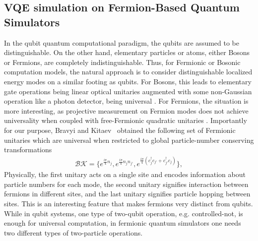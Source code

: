 \documentclass[aps, prx, reprint, superscriptaddress]{revtex4-2}
\begin{document}
\subsection{VQE simulation on Fermion-Based Quantum Simulators}
\label{subsec:vqe_fermionic_simulator}

In the qubit quantum computational paradigm, the qubits are assumed to be distinguishable. On the other hand, elementary particles or atoms, either Bosons or Fermions, are completely indistinguishable. Thus, for Fermionic or Bosonic computation models, the natural approach is to consider distinguishable localized energy modes on a similar footing as qubits. For Bosons, this leads to elementary gate operations being linear optical unitaries augmented with some non-Gaussian operation like a photon detector, being universal \cite{knill2001scheme}. For Fermions, the situation is more interesting, as projective measurement on Fermion modes does not achieve universality when coupled with free-Fermionic quadratic unitaries \citep{terhal2002classical}. Importantly for our purpose, Bravyi and Kitaev~\citep{bravyi2002fermionic} obtained the following set of Fermionic unitaries which are universal when restricted to global particle-number conserving transformations
\begin{eqnarray}
    \mathcal{BK} =   \lbrace e^{\frac{i \pi}{4} n_{j}}, e^{\frac{i \pi}{4} n_{j} n_{j'}},
    e^{\frac{i \pi}{4} \left( c_{j}^{\dagger} c_{j'} +  c_{j'}^{\dagger} c_{j} \right) }  \rbrace,
    \label{eq:bravyi-kitaev}
\end{eqnarray}
Physically, the first unitary acts on a single site and encodes information about particle numbers for each mode, the second unitary signifies interaction between fermions in different sites, and the last unitary signifies particle hopping between sites. This is an interesting feature that makes fermions very distinct from qubits. While in qubit systems, one type of two-qubit operation, e.g. controlled-not, is enough for universal computation, in fermionic quantum simulators one needs two different types of two-particle operations. 
\end{document}
